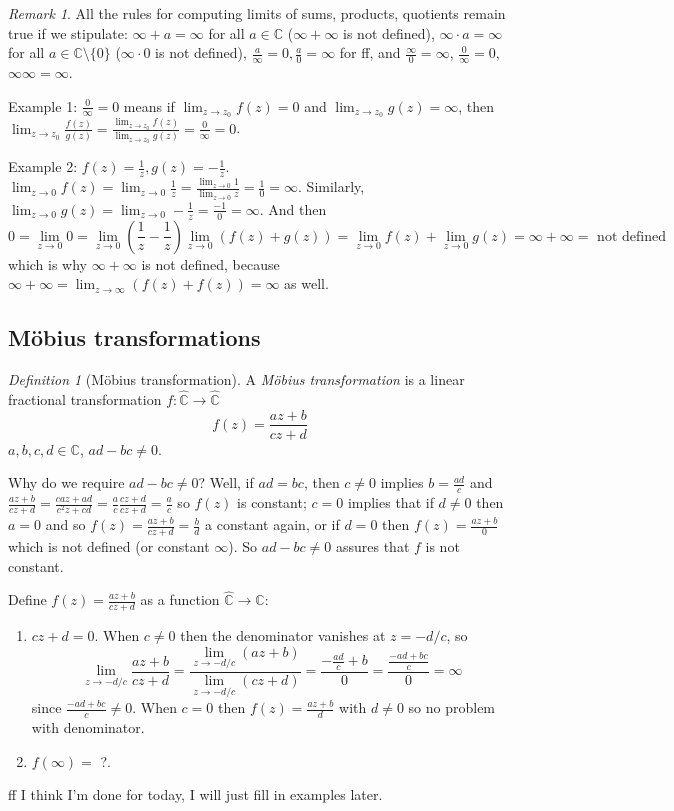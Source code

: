 \documentclass{article}
\theoremstyle{plain}
\theoremstyle{remark}
\newtheorem{definition}{Definition}
\newtheorem{remark}{Remark}
\newcommand{\C}{{\mathbb C}}
\begin{document}
\begin{remark}
	All the rules for computing limits of sums, products, quotients remain true
	if we stipulate:
	$\infty + a = \infty$ for all $a \in \C$ ($\infty+\infty$ is not defined),
	$\infty \cdot a = \infty$ for all $a \in \C\setminus\{0\}$
	($\infty\cdot0$ is not defined),
	$\frac{a}{\infty} = 0, \frac{a}{0} = \infty$ for ff,
	and $\frac{\infty}{0} = \infty$, $\frac{0}{\infty}=0$, $\infty\infty = \infty$.
\end{remark}

Example 1: $\frac{0}{\infty} = 0$ means if $\lim_{z \to z_0}f(z) = 0$ and
$\lim_{z\to z_0}g(z) = \infty$,
then $\lim_{z\to z_0}\frac{f(z)}{g(z)} =
\frac{\lim_{z\to z_0}f(z)}{\lim_{z\to z_0}g(z)} = \frac{0}{\infty} = 0$.

Example 2: $f(z) = \frac{1}{z}, g(z) = -\frac{1}{z}$.
$\lim_{z \to 0} f(z) = \lim_{z \to 0} \frac{1}{z}
= \frac{\lim_{z \to 0} 1}{\lim_{z \to 0} z} = \frac{1}{0} = \infty$.
Similarly, $\lim_{z \to 0} g(z) = \lim_{z \to 0} -\frac{1}{z}
= \frac{-1}{0} = \infty$.
And then
\[
	0 = \lim_{z \to 0}0 = \lim_{z \to 0}\left(\frac{1}{z}-\frac{1}{z}\right)
	\lim_{z\to0}\left(f(z) + g(z)\right) =
	\lim_{z \to 0}f(z) + \lim_{z \to 0}g(z) = \infty + \infty = \text{ not defined}
\]
which is why $\infty + \infty$ is not defined,
because $\infty + \infty = \lim_{z\to\infty}\left(f(z) + f(z)\right) = \infty$ as well.

\subsection{M\"{o}bius transformations}
\begin{definition}[M\"{o}bius transformation]
	A \emph{M\"{o}bius transformation} is a linear fractional transformation
	$f \colon \hat{\C} \to \hat{\C}$
	\[
		f(z) = \frac{az + b}{cz + d}
	\]
	$a,b,c,d \in \C$, $ad - bc \neq 0$.
\end{definition}
Why do we require $ad - bc \neq 0$?
Well, if $ad = bc$, then
$c \neq 0$ implies $b = \frac{ad}{c}$ and
$\frac{az+b}{cz+d} = \frac{caz + ad}{c^2z+cd} = \frac{a}{c}\frac{cz+d}{cz+d} = \frac{a}{c}$
so $f(z)$ is constant;
$c = 0$ implies that if $d \neq 0$ then $a = 0$ and so
$f(z) = \frac{az+b}{cz+d} = \frac{b}{d}$ a constant again,
or if $d = 0$ then $f(z) = \frac{az+b}{0}$ which is not defined (or constant $\infty$).
So $ad - bc \neq 0$ assures that $f$ is not constant.

Define $f(z) = \frac{az+b}{cz+d}$ as a function $\hat{\C} \to \hat{\C}$:
\begin{enumerate}
	\item $cz + d = 0$.
		When $c \neq 0$ then the denominator vanishes at $z = -d/c$,
		so
		\[
			\lim_{z \to -d/c} \frac{az+b}{cz+d}
			= \frac{\displaystyle\lim_{z\to-d/c}(az+b)}{\displaystyle\lim_{z\to-d/c}(cz+d)}
			= \frac{-\frac{ad}{c}+b}{0}
			= \frac{\frac{-ad+bc}{c}}{0} = \infty
		\]
		since $\frac{-ad+bc}{c} \neq 0$.
		When $c = 0$ then $f(z) = \frac{az+b}{d}$ with $d\neq0$ so no problem with denominator.
	\item $f(\infty) =$ ?.
\end{enumerate}
ff I think I'm done for today, I will just fill in examples later.
\end{document}
